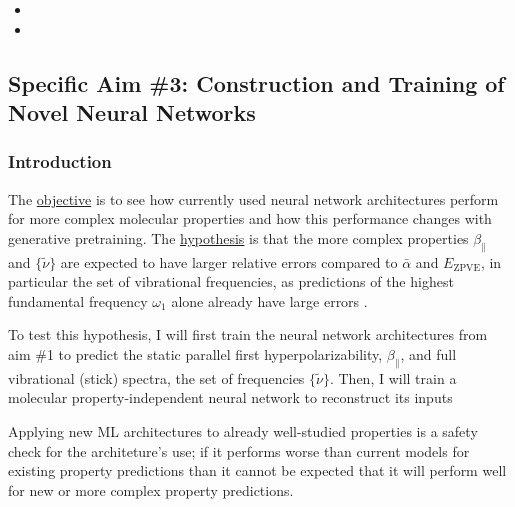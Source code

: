 \documentclass[12pt]{article}
\begin{document}
\begin{itemize}
\item {}
\item {}
\end{itemize}

\subsection{Specific Aim \#3: Construction and Training of Novel Neural Networks}
\label{sec:orgf0f835e}

\subsubsection{Introduction}
\label{sec:orgd8b567c}

The \uline{objective} is to see how currently used neural network architectures perform for more complex molecular properties and how this performance changes with generative pretraining. The \uline{hypothesis} is that the more complex properties \(\beta_{\parallel}\) and \(\{\tilde{\nu}\}\) are expected to have larger relative errors compared to \(\bar{\alpha}\) and \(E_{\text{ZPVE}}\), in particular the set of vibrational frequencies, as predictions of the highest fundamental frequency \(\omega_1\) alone already have large errors \cite{2017arXiv170205532F}.


To test this hypothesis, I will first train the neural network architectures from aim \#1 to predict the static parallel first hyperpolarizability, \(\beta_{\parallel}\), and full vibrational (stick) spectra, the set of frequencies \(\{\tilde{\nu}\}\). Then, I will train a molecular property-independent neural network to reconstruct its inputs

Applying new ML architectures to already well-studied properties is a safety check for the architeture's use; if it performs worse than current models for existing property predictions than it cannot be expected that it will perform well for new or more complex property predictions.

\end{document}
